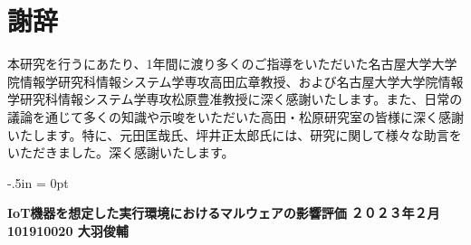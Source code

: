 \documentclass[12pt,a4paper,titlepage,report]{jsbook}
\begin{document}

\newpage
\renewcommand{\bibname}{参考文献}


\chapter*{謝辞}
本研究を行うにあたり、1年間に渡り多くのご指導をいただいた名古屋大学大学院情報学研究科情報システム学専攻高田広章教授、および名古屋大学大学院情報学研究科情報システム学専攻松原豊准教授に深く感謝いたします。また、日常の議論を通じて多くの知識や示唆をいただいた高田・松原研究室の皆様に深く感謝いたします。特に、元田匡哉氏、坪井正太郎氏には、研究に関して様々な助言をいただきました。深く感謝いたします。


\clearpage
\thispagestyle{empty}
\oddsidemargin -2.5in
\evensidemargin -2.5in
\topmargin -.5in
\marginparwidth = 0pt
{
	\tate
	\begin{minipage}{8.0in}
		\small
		\textbf{IoT機器を想定した実行環境におけるマルウェアの影響評価}
		\hfill
		\textbf{２０２３年２月}
		\hfill
		\textbf{101910020 大羽俊輔}
	\end{minipage}
}
\end{document}
